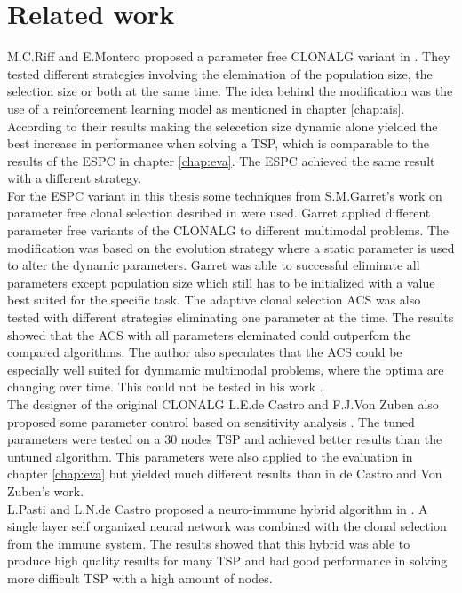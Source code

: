 \chapter{Related work}
\label{chap:rlw}
M.C.Riff and E.Montero proposed a parameter free CLONALG variant in \cite{RIFF09}. They tested different strategies involving the elemination of the population size, the selection size or both at the same time. The idea behind the modification was the use of a reinforcement learning model as mentioned in chapter \ref{chap:ais}. According to their results making the selecetion size dynamic alone yielded the best increase in performance when solving a TSP, which is comparable to the results of the ESPC in chapter \ref{chap:eva}. The ESPC achieved the same result with a different strategy.\\
For the ESPC variant in this thesis some techniques from S.M.Garret's work on parameter free clonal selection desribed in \cite{Garret04} were used. Garret applied different parameter free variants of the CLONALG to different multimodal problems. The modification was based on the evolution strategy where a static parameter is used to alter the dynamic parameters. Garret was able to successful eliminate all parameters except population size which still has to be initialized with a value best suited for the specific task. The adaptive clonal selection ACS was also tested with different strategies eliminating one parameter at the time. The results showed that the ACS with all parameters eleminated could outperfom the compared algorithms. The author also speculates that the ACS could be especially well suited for dynmamic multimodal problems, where the optima are changing over time. This could not be tested in his work \cite{Garret04}.\\
The designer of the original CLONALG L.E.de Castro and F.J.Von Zuben also proposed some parameter control based on sensitivity analysis \cite{DEC02}. The tuned parameters were tested on a 30 nodes TSP and achieved better results than the untuned algorithm. This parameters were also applied to the evaluation in chapter \ref{chap:eva} but yielded much different results than in de Castro and Von Zuben's work.\\
L.Pasti and L.N.de Castro proposed a neuro-immune hybrid algorithm in \cite{Pasti06}. A single layer self organized neural network was combined with the clonal selection from the immune system. The results showed that this hybrid was able to produce high quality results for many TSP and had good performance in solving more difficult TSP with a high amount of nodes. 
